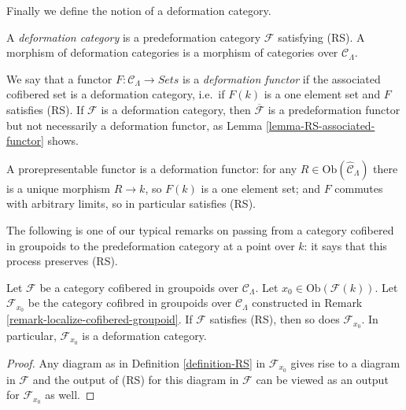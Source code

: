 \noindent
Finally we define the notion of a deformation category.

\begin{definition}
\label{definition-deformation-category}
A {\it deformation category} is a predeformation category $\mathcal{F}$ 
satisfying (RS). A morphism of deformation categories is a morphism of 
categories over $\mathcal{C}_\Lambda$.
\end{definition}

\begin{remark}
\label{remark-deformation-functor}
We say that a functor $F: \mathcal{C}_\Lambda \to \textit{Sets}$ 
is a {\it deformation functor} if the associated cofibered set is a 
deformation category, i.e.\ if $F(k)$ is a one element set and $F$ satisfies 
(RS). If $\mathcal{F}$ is a deformation category, then
$\overline{\mathcal{F}}$ 
is a predeformation functor but not necessarily a deformation functor, as
Lemma \ref{lemma-RS-associated-functor} shows.
\end{remark}

\begin{example}
\label{example-prorepresentable-deformation-functor}
A prorepresentable functor is a deformation functor: for any $R \in 
\text{Ob}(\widehat{\mathcal{C}}_\Lambda)$ there is a unique morphism $R 
\to k$, so $F(k)$ is a one element set; and $F$ commutes with arbitrary 
limits, so in particular satisfies (RS).
\end{example}

\noindent
The following is one of our typical remarks on passing from a category 
cofibered in groupoids to the predeformation category at a point over $k$: it 
says that this process preserves (RS).

\begin{lemma}
\label{lemma-localize-RS}
Let $\mathcal{F}$ be a category cofibered in groupoids over
$\mathcal{C}_\Lambda$. Let $x_0 \in \text{Ob}(\mathcal{F}(k))$.
Let $\mathcal{F}_{x_0}$ be the category cofibred in groupoids over
$\mathcal{C}_\Lambda$ constructed in
Remark \ref{remark-localize-cofibered-groupoid}.
If $\mathcal{F}$ satisfies (RS), then so does $\mathcal{F}_{x_0}$.
In particular, $\mathcal{F}_{x_0}$ is a deformation category.
\end{lemma}

\begin{proof}
Any diagram as in
Definition \ref{definition-RS}
in $\mathcal{F}_{x_0}$ gives rise to a diagram in $\mathcal{F}$
and the output of (RS) for this diagram in $\mathcal{F}$
can be viewed as an output for $\mathcal{F}_{x_0}$ as well.
\end{proof}




